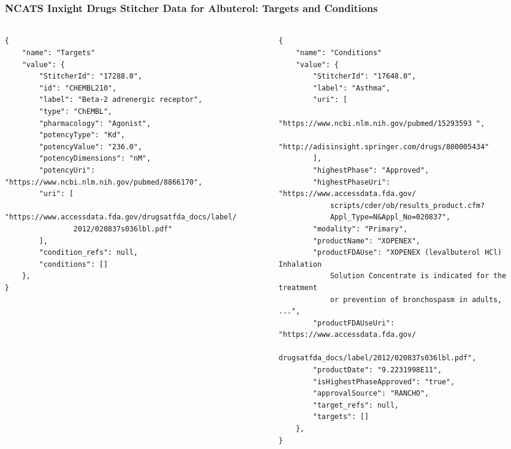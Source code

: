 \documentclass[aspectratio=169,xcolor=dvipsnames]{beamer}
\begin{document}
\begin{frame}[fragile,t]
  \frametitle{NCATS Inxight Drugs Stitcher Data for Albuterol: Targets and Conditions}
  \framesubtitle{}
  \tiny
  \begin{columns}[t]
    \begin{column}{0.5\textwidth}
    \vspace{-3\baselineskip}
\begin{verbatim}
{
    "name": "Targets"
    "value": {
        "StitcherId": "17288.0",
        "id": "CHEMBL210",
        "label": "Beta-2 adrenergic receptor",
        "type": "ChEMBL",
        "pharmacology": "Agonist",
        "potencyType": "Kd",
        "potencyValue": "236.0",
        "potencyDimensions": "nM",
        "potencyUri": "https://www.ncbi.nlm.nih.gov/pubmed/8866170",
        "uri": [
            "https://www.accessdata.fda.gov/drugsatfda_docs/label/
                2012/020837s036lbl.pdf"
        ],
        "condition_refs": null,
        "conditions": []
    },
}
\end{verbatim}
    \end{column}
    \begin{column}{0.5\textwidth}
      \vspace{-3\baselineskip}
\begin{verbatim}
{
    "name": "Conditions"
    "value": {
        "StitcherId": "17648.0",
        "label": "Asthma",
        "uri": [
            "https://www.ncbi.nlm.nih.gov/pubmed/15293593 ",
            "http://adisinsight.springer.com/drugs/800005434"
        ],
        "highestPhase": "Approved",
        "highestPhaseUri": "https://www.accessdata.fda.gov/
            scripts/cder/ob/results_product.cfm?
            Appl_Type=N&Appl_No=020837",
        "modality": "Primary",
        "productName": "XOPENEX",
        "productFDAUse": "XOPENEX (levalbuterol HCl) Inhalation
            Solution Concentrate is indicated for the treatment
            or prevention of bronchospasm in adults, ...",
        "productFDAUseUri": "https://www.accessdata.fda.gov/
            drugsatfda_docs/label/2012/020837s036lbl.pdf",
        "productDate": "9.2231998E11",
        "isHighestPhaseApproved": "true",
        "approvalSource": "RANCHO",
        "target_refs": null,
        "targets": []
    },
}
\end{verbatim}
    \end{column}
  \end{columns}
\end{frame}
\end{document}
